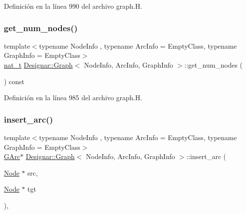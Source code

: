 Definición en la línea 990 del archivo graph.\+H.

\mbox{\label{class_designar_1_1_graph_af6f0ef48386dd1353880ff706387c4e8}} 
\subsubsection{\texorpdfstring{get\+\_\+num\+\_\+nodes()}{get\_num\_nodes()}}
{\footnotesize\ttfamily template$<$typename Node\+Info , typename Arc\+Info  = Empty\+Class, typename Graph\+Info  = Empty\+Class$>$ \\
\hyperlink{namespace_designar_aa72662848b9f4815e7bf31a7cf3e33d1}{nat\+\_\+t} \hyperlink{class_designar_1_1_graph}{Designar\+::\+Graph}$<$ Node\+Info, Arc\+Info, Graph\+Info $>$\+::get\+\_\+num\+\_\+nodes (\begin{DoxyParamCaption}{ }\end{DoxyParamCaption}) const\hspace{0.3cm}{\ttfamily [inline]}}



Definición en la línea 985 del archivo graph.\+H.

\mbox{\label{class_designar_1_1_graph_a20f183a1481fb62bc775aca6bd3244d1}} 
\subsubsection{\texorpdfstring{insert\+\_\+arc()}{insert\_arc()}\hspace{0.1cm}{\footnotesize\ttfamily [1/4]}}
{\footnotesize\ttfamily template$<$typename Node\+Info , typename Arc\+Info  = Empty\+Class, typename Graph\+Info  = Empty\+Class$>$ \\
\hyperlink{class_designar_1_1_graph_a5ad9e18b71899c2d4979426e367e5573}{G\+Arc}$\ast$ \hyperlink{class_designar_1_1_graph}{Designar\+::\+Graph}$<$ Node\+Info, Arc\+Info, Graph\+Info $>$\+::insert\+\_\+arc (\begin{DoxyParamCaption}\item[{\hyperlink{class_designar_1_1_graph_a5dfc7dba9d092ac489c72e40390c37d0}{Node} $\ast$}]{src,  }\item[{\hyperlink{class_designar_1_1_graph_a5dfc7dba9d092ac489c72e40390c37d0}{Node} $\ast$}]{tgt }\end{DoxyParamCaption})\hspace{0.3cm}{\ttfamily [inline]}, {\ttfamily [protected]}}



